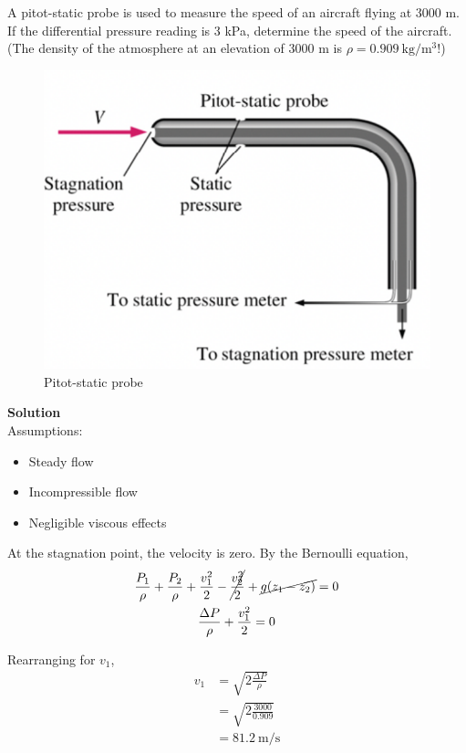 \section{}

A pitot-static probe is used to measure the speed of an aircraft flying
at 3000 m. If the differential pressure reading is 3 kPa, determine the speed of the aircraft. (The
density of the atmosphere at an elevation of 3000 m is $\rho = \qty{0.909}{\kilo\gram\per\meter\cubed}$!)

\begin{figure}[h]
    \centering
    \includegraphics[width=0.5\linewidth]{Questions/Figures/Q2ProblemDiagram.png}
    \caption{Pitot-static probe}
    \label{fig:Q2ProblemDiagram}
\end{figure}

\textbf{Solution} \\
Assumptions:
\begin{itemize}
    \item Steady flow
    \item Incompressible flow
    \item Negligible viscous effects
\end{itemize}

At the stagnation point, the velocity is zero. By the Bernoulli equation, 
\begin{gather*}
    \frac{P_1}{\rho} + \frac{P_2}{\rho} + \frac{v_1^2}{2} - \cancel{\frac{v_2^2}{2}} + \cancel{g(z_1 - z_2)} = 0 \\
    \frac{\Delta P}{\rho} + \frac{v_1^2}{2} = 0 \\
\end{gather*}

Rearranging for $v_1$,
\begin{align*}
    v_1 &= \sqrt{2\frac{\Delta P}{\rho}} \\
    &= \sqrt{2\frac{3000}{0.909}} \\
    &= \boxed{\qty{81.2}{\meter\per\second}}
\end{align*}